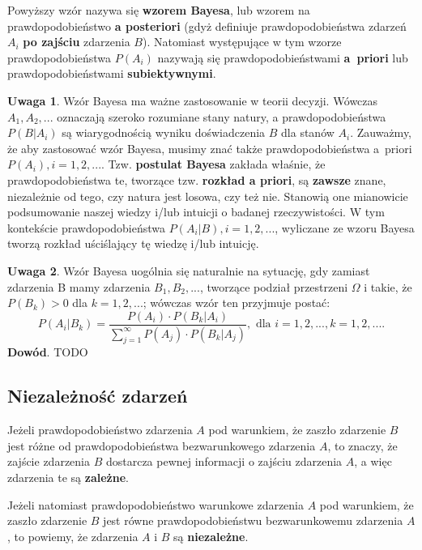 \documentclass[10pt,a4paper]{article}
\begin{document}
Powyższy wzór nazywa się \textbf{wzorem Bayesa}, lub wzorem na prawdopodobieństwo \textbf{a posteriori} (gdyż definiuje prawdopodobieństwa zdarzeń $A_i$ \textbf{po zajściu}
zdarzenia $B$). Natomiast występujące w tym wzorze prawdopodobieństwa $P(A_i)$ nazywają się prawdopodobieństwami \textbf{a~priori} lub 
prawdopodobieństwami \textbf{subiektywnymi}.

\textbf{Uwaga 1}. Wzór Bayesa ma ważne zastosowanie w teorii  decyzji. Wówczas $A_1,A_2,...$ oznaczają szeroko rozumiane stany natury, a prawdopodobieństwa $P(B|A_i)$ są
wiarygodnością wyniku doświadczenia $B$ dla stanów $A_i$. Zauważmy, że aby zastosować wzór Bayesa, musimy znać także prawdopodobieństwa a~priori $P(A_i), i=1,2,...$.
Tzw. \textbf{postulat Bayesa} zakłada właśnie, że prawdopodobieństwa te, tworzące tzw. \textbf{rozkład a priori}, są \textbf{zawsze} znane, niezależnie od tego, czy natura 
jest losowa, czy też nie. Stanowią one mianowicie podsumowanie naszej wiedzy i/lub intuicji o badanej rzeczywistości. W tym kontekście prawdopodobieństwa 
$P(A_i|B), i=1,2,...$, wyliczane ze wzoru Bayesa tworzą rozkład uściślający tę wiedzę i/lub intuicję.

\textbf{Uwaga 2}. Wzór Bayesa uogólnia się naturalnie na sytuację, gdy zamiast zdarzenia B mamy zdarzenia $B_1,B_2,...$, tworzące podział przestrzeni $\Omega$ i takie,
że $P(B_k)>0$ dla $k=1,2,...$; wówczas wzór ten przyjmuje postać:
\begin{equation}
P(A_i|B_k) = \frac{P(A_i)\cdot P(B_k|A_i)}{\sum_{j=1}^{\infty}P(A_j)\cdot P(B_k|A_j)}, \textrm{ dla } i=1,2,..., k=1,2,...\textrm{.}
\end{equation}
\textbf{Dowód}. TODO

\subsection{Niezależność zdarzeń}
Jeżeli prawdopodobieństwo zdarzenia $A$ pod warunkiem, że zaszło zdarzenie $B$ jest różne od prawdopodobieństwa bezwarunkowego zdarzenia $A$, to znaczy, że zajście zdarzenia
$B$ dostarcza pewnej informacji o zajściu zdarzenia $A$, a więc zdarzenia te są \textbf{zależne}.

Jeżeli natomiast prawdopodobieństwo warunkowe zdarzenia $A$ pod warunkiem, że zaszło zdarzenie $B$ jest równe prawdopodobieństwu bezwarunkowemu zdarzenia $A$, to powiemy, 
że zdarzenia $A$ i $B$ są \textbf{niezależne}.
\end{document}
